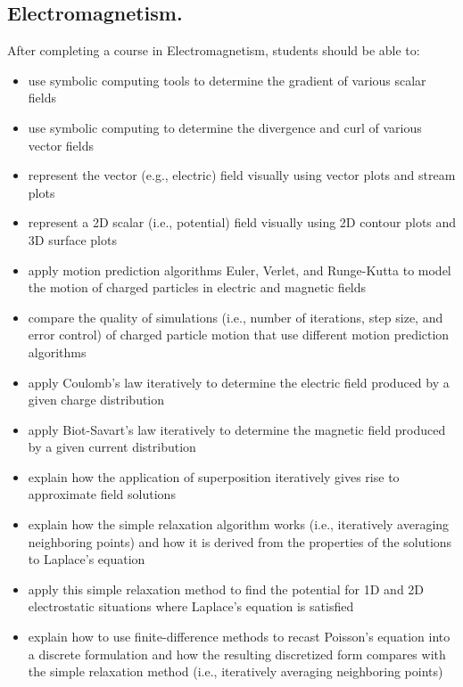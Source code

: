 \documentclass[graybox,envcountchap,sectrefs]{svmult}
\begin{document}
\subsection{Electromagnetism.}
After completing a course in Electromagnetism, students should be able to:
\begin{itemize}
\item use symbolic computing tools to determine the gradient of various scalar fields

\item use symbolic computing to determine the divergence and curl of various vector fields

\item represent the vector (e.g., electric) field visually using vector plots and stream plots

\item represent a 2D scalar (i.e., potential) field visually using 2D contour plots and 3D surface plots

\item apply motion prediction algorithms Euler, Verlet, and Runge-Kutta to model the motion of charged particles in electric and magnetic fields

\item compare the quality of simulations (i.e., number of iterations, step size, and error control) of charged particle motion that use different motion prediction algorithms

\item apply Coulomb's law iteratively to determine the electric field produced by a given charge distribution

\item apply Biot-Savart's law iteratively to determine the magnetic field produced by a given current distribution

\item explain how the application of superposition iteratively gives rise to approximate field solutions

\item explain how the simple relaxation algorithm works (i.e., iteratively averaging neighboring points) and how it is derived from the properties of the solutions to Laplace's equation

\item apply this simple relaxation method to find the potential for 1D and 2D electrostatic situations where Laplace's equation is satisfied

\item explain how to use  finite-difference methods to recast Poisson's equation into a discrete formulation and how the resulting discretized form compares with the simple relaxation method (i.e., iteratively averaging neighboring points)


\end{itemize}
\end{document}
